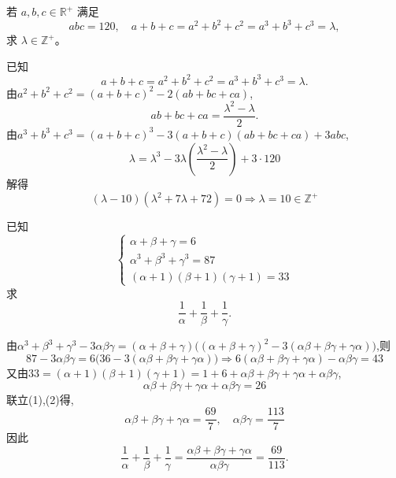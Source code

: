 \begin{questions}
    \question 若 $a,b,c \in \mathbb{R}^+$ 满足
    \[
    abc = 120, \quad a+b+c = a^2+b^2+c^2 = a^3+b^3+c^3 = \lambda,
    \]
    求 $\lambda \in \mathbb{Z}^+$。
    \begin{solution}
        已知
        \[
        a+b+c = a^2+b^2+c^2 = a^3+b^3+c^3 = \lambda.
        \]
        由$a^2+b^2+c^2 = (a+b+c)^2 - 2(ab+bc+ca)$,
        \[
        ab+bc+ca = \frac{\lambda^2 - \lambda}{2}.
        \]
        由$a^3+b^3+c^3 = (a+b+c)^3 - 3(a+b+c)(ab+bc+ca) + 3abc$,
        \[
        \lambda = \lambda^3 - 3 \lambda \left(\frac{\lambda^2 - \lambda}{2}\right) + 3 \cdot 120 
        \]
        解得
        \[
        (\lambda-10)(\lambda^2+7\lambda+72)=0 \Rightarrow \lambda = 10 \in \mathbb{Z}^+
        \]
    \end{solution}

    \question 已知
    \[
    \begin{cases} 
    \alpha+\beta+\gamma=6 \\ 
    \alpha^3+\beta^3+\gamma^3=87 \\ 
    (\alpha+1)(\beta+1)(\gamma+1)=33 
    \end{cases}
    \]
    求
    \[
    \frac{1}{\alpha}+\frac{1}{\beta}+\frac{1}{\gamma}.
    \]
    \begin{solution}
        由$\alpha^3+\beta^3+\gamma^3 - 3\alpha\beta\gamma = (\alpha+\beta+\gamma)\bigl((\alpha+\beta+\gamma)^2 - 3(\alpha\beta+\beta\gamma+\gamma\alpha)\bigr)$,则
        \[
        87 - 3\alpha\beta\gamma = 6\bigl(36 - 3(\alpha\beta+\beta\gamma+\gamma\alpha)\bigr) \Rightarrow 6(\alpha\beta+\beta\gamma+\gamma\alpha) - \alpha\beta\gamma = 43 \tag{1}
        \]
        又由$33=(\alpha+1)(\beta+1)(\gamma+1) = 1 + 6 + \alpha\beta+\beta\gamma+\gamma\alpha + \alpha\beta\gamma$,
        \[
        \alpha\beta+\beta\gamma+\gamma\alpha + \alpha\beta\gamma = 26 \tag{2}
        \]
        联立(1),(2)得,
        \[
        \alpha\beta+\beta\gamma+\gamma\alpha = \frac{69}{7}, \quad \alpha\beta\gamma = \frac{113}{7}
        \]
        因此
        \[
        \frac{1}{\alpha}+\frac{1}{\beta}+\frac{1}{\gamma} = \frac{\alpha\beta+\beta\gamma+\gamma\alpha}{\alpha\beta\gamma} = \frac{69}{113}.
        \]
    \end{solution}


\end{questions}
